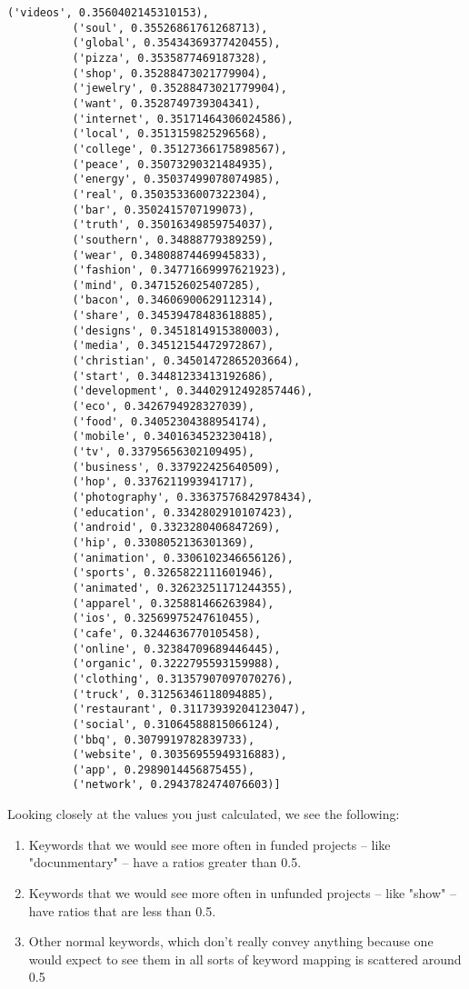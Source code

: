 \documentclass[11pt]{article}
\providecommand{\tightlist}{%
      \setlength{\itemsep}{0pt}\setlength{\parskip}{0pt}}
\begin{document}
\begin{Verbatim}[commandchars=\\\{\}]
          ('videos', 0.3560402145310153),
          ('soul', 0.35526861761268713),
          ('global', 0.35434369377420455),
          ('pizza', 0.3535877469187328),
          ('shop', 0.35288473021779904),
          ('jewelry', 0.35288473021779904),
          ('want', 0.3528749739304341),
          ('internet', 0.35171464306024586),
          ('local', 0.3513159825296568),
          ('college', 0.35127366175898567),
          ('peace', 0.35073290321484935),
          ('energy', 0.35037499078074985),
          ('real', 0.35035336007322304),
          ('bar', 0.3502415707199073),
          ('truth', 0.35016349859754037),
          ('southern', 0.34888779389259),
          ('wear', 0.34808874469945833),
          ('fashion', 0.34771669997621923),
          ('mind', 0.3471526025407285),
          ('bacon', 0.34606900629112314),
          ('share', 0.34539478483618885),
          ('designs', 0.3451814915380003),
          ('media', 0.34512154472972867),
          ('christian', 0.34501472865203664),
          ('start', 0.34481233413192686),
          ('development', 0.34402912492857446),
          ('eco', 0.3426794928327039),
          ('food', 0.34052304388954174),
          ('mobile', 0.3401634523230418),
          ('tv', 0.33795656302109495),
          ('business', 0.337922425640509),
          ('hop', 0.3376211993941717),
          ('photography', 0.33637576842978434),
          ('education', 0.3342802910107423),
          ('android', 0.3323280406847269),
          ('hip', 0.3308052136301369),
          ('animation', 0.3306102346656126),
          ('sports', 0.3265822111601946),
          ('animated', 0.32623251171244355),
          ('apparel', 0.325881466263984),
          ('ios', 0.32569975247610455),
          ('cafe', 0.3244636770105458),
          ('online', 0.32384709689446445),
          ('organic', 0.3222795593159988),
          ('clothing', 0.31357907097070276),
          ('truck', 0.31256346118094885),
          ('restaurant', 0.31173939204123047),
          ('social', 0.31064588815066124),
          ('bbq', 0.3079919782839733),
          ('website', 0.30356955949316883),
          ('app', 0.2989014456875455),
          ('network', 0.2943782474076603)]
\end{Verbatim}
            
    Looking closely at the values you just calculated, we see the following:

\begin{enumerate}
\def\labelenumi{\arabic{enumi}.}
\tightlist
\item
  Keywords that we would see more often in funded projects -- like
  "docunmentary" -- have a ratios greater than 0.5.
\item
  Keywords that we would see more often in unfunded projects -- like
  "show" -- have ratios that are less than 0.5.
\item
  Other normal keywords, which don't really convey anything because one
  would expect to see them in all sorts of keyword mapping is scattered
  around 0.5
\end{enumerate}
\end{document}
